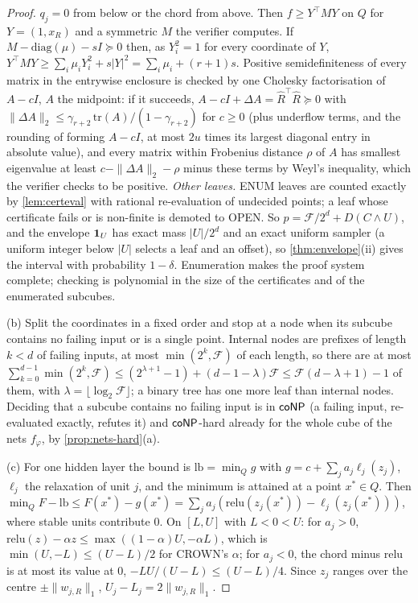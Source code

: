 \begin{proof}
$q_j=0$ from below or the chord from above. Then $f\ge Y^\top MY$ on $Q$ for
$Y=(1,x_R)$ and a symmetric $M$ the verifier computes. If
$M-\mathrm{diag}(\mu)-sI\succeq0$ then, as $Y_i^2=1$ for every coordinate of $Y$,
$Y^\top MY\ge\sum_i\mu_iY_i^2+s|Y|^2=\sum_i\mu_i+(r+1)s$. Positive semidefiniteness of
every matrix in the entrywise enclosure is checked by one Cholesky factorisation of
$A-cI$, $A$ the midpoint: if it succeeds, $A-cI+\Delta A=\hat R^\top\hat R\succeq0$ with
$\|\Delta A\|_2\le\gamma_{r+2}\,\mathrm{tr}(A)/(1-\gamma_{r+2})$ for $c\ge0$
\cite[Thm.~10.3]{higham2002} (plus underflow terms, and the rounding of forming
$A-cI$, at most $2u$ times its largest diagonal entry in absolute value), and every matrix within
Frobenius distance $\rho$ of $A$ has smallest eigenvalue at least
$c-\|\Delta A\|_2-\rho$ minus these terms by Weyl's inequality, which the verifier
checks to be positive. \emph{Other leaves.} ENUM leaves are counted exactly by \cref{lem:certeval}
with rational re-evaluation of undecided points; a leaf whose certificate fails or is
non-finite is demoted to OPEN. So $p=\mathcal F/2^d+D(C\wedge U)$, and the envelope
$\mathbf{1}_U$ has exact mass $|U|/2^d$ and an exact uniform sampler (a uniform integer below
$|U|$ selects a leaf and an offset), so \cref{thm:envelope}(ii) gives the interval
with probability $1-\delta$. Enumeration makes the proof system complete; checking is
polynomial in the size of the certificates and of the enumerated subcubes.

(b) Split the coordinates in a fixed order and stop at a node when its subcube
contains no failing input or is a single point. Internal nodes are prefixes of length
$k<d$ of failing inputs, at most $\min(2^k,\mathcal F)$ of each length, so there are at
most $\sum_{k=0}^{d-1}\min(2^k,\mathcal F)\le(2^{\lambda+1}-1)+(d-1-\lambda)\mathcal F\le
\mathcal F(d-\lambda+1)-1$ of them, with $\lambda=\lfloor\log_2\mathcal F\rfloor$; a binary
tree has one more leaf than internal nodes. Deciding that a subcube contains no
failing input is in $\mathsf{coNP}$ (a failing input, re-evaluated exactly, refutes it) and
$\mathsf{coNP}$-hard already for the whole cube of the nets $f_\varphi$, by
\cref{prop:nets-hard}(a).

(c) For one hidden layer the bound is $\mathrm{lb}=\min_Qg$ with
$g=c+\sum_ja_j\ell_j(z_j)$, $\ell_j$ the relaxation of unit $j$, and the minimum is
attained at a point $x^*\in Q$. Then $\min_QF-\mathrm{lb}\le F(x^*)-g(x^*)=\sum_ja_j
(\mathrm{relu}(z_j(x^*))-\ell_j(z_j(x^*)))$, where stable units contribute $0$. On
$[L,U]$ with $L<0<U$: for $a_j>0$, $\mathrm{relu}(z)-\alpha z\le\max((1-\alpha)U,-\alpha L)$,
which is $\min(U,-L)\le(U-L)/2$ for CROWN's $\alpha$; for $a_j<0$, the chord minus
$\mathrm{relu}$ is at most its value at $0$, $-LU/(U-L)\le(U-L)/4$. Since $z_j$ ranges
over the centre $\pm\|w_{j,R}\|_1$, $U_j-L_j=2\|w_{j,R}\|_1$.
\end{proof}

